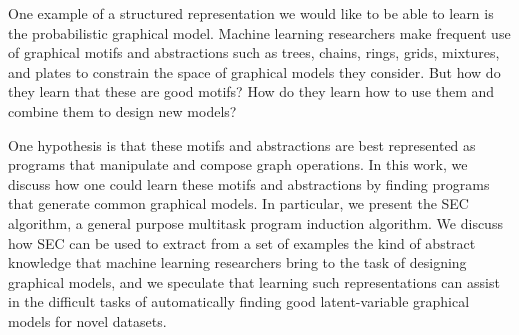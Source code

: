 \documentclass{article} %
\begin{document}
One example of a structured representation we would like to be able to learn is the probabilistic graphical model. %
Machine learning researchers make frequent use of graphical motifs and abstractions such as trees, chains, rings, grids, mixtures, and plates to constrain the space of graphical models they consider. But how do they learn that these are good motifs? How do they learn how to use them and combine them to design new models? 

One hypothesis is that these motifs and abstractions are best represented as programs that manipulate and compose graph operations. In this work, we discuss how one could learn these motifs and abstractions by finding programs that generate common graphical models. In particular, we present the SEC algorithm, a general purpose multitask program induction algorithm.
We discuss how SEC can be used to extract from a set of examples the kind of abstract knowledge that machine learning researchers bring to the task of designing graphical models, and we speculate that learning such representations can assist in the difficult tasks of automatically finding good latent-variable graphical models for novel datasets. 

\end{document}
